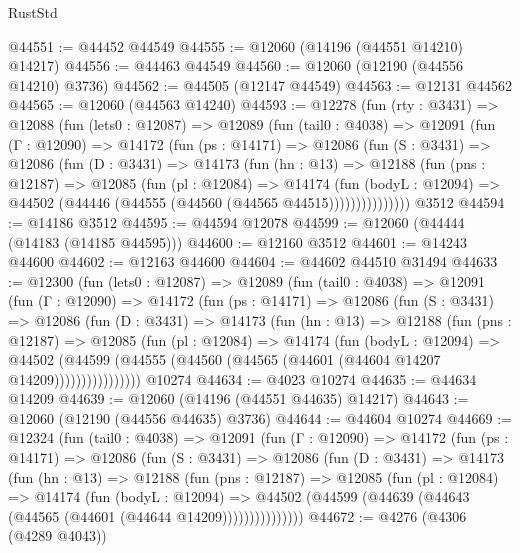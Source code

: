 \begin{lexlean}{RustStd}
\begin{coremodule}
@44551 := @44452 @44549
@44555 := @12060 (@14196 (@44551 @14210) @14217)
@44556 := @44463 @44549
@44560 := @12060 (@12190 (@44556 @14210) @3736)
@44562 := @44505 (@12147 @44549)
@44563 := @12131 @44562
@44565 := @12060 (@44563 @14240)
@44593 := @12278
    (fun (rty : @3431) =>
    @12088
      (fun (lets0 : @12087) =>
      @12089
        (fun (tail0 : @4038) =>
        @12091
          (fun (Γ : @12090) =>
          @14172
            (fun (ps : @14171) =>
            @12086
              (fun (S : @3431) =>
              @12086
                (fun (D : @3431) =>
                @14173
                  (fun (hn : @13) =>
                  @12188
                    (fun (pns : @12187) =>
                    @12085
                      (fun (pl : @12084) =>
                      @14174
                        (fun (bodyL : @12094) =>
                        @44502 (@44446 (@44555 (@44560 (@44565 @44515)))))))))))))))
    @3512
@44594 := @14186 @3512
@44595 := @44594 @12078
@44599 := @12060 (@44444 (@14183 (@14185 @44595)))
@44600 := @12160 @3512
@44601 := @14243 @44600
@44602 := @12163 @44600
@44604 := @44602 @44510 @31494
@44633 := @12300
    (fun (lets0 : @12087) =>
    @12089
      (fun (tail0 : @4038) =>
      @12091
        (fun (Γ : @12090) =>
        @14172
          (fun (ps : @14171) =>
          @12086
            (fun (S : @3431) =>
            @12086
              (fun (D : @3431) =>
              @14173
                (fun (hn : @13) =>
                @12188
                  (fun (pns : @12187) =>
                  @12085
                    (fun (pl : @12084) =>
                    @14174
                      (fun (bodyL : @12094) =>
                      @44502
                        (@44599
                          (@44555 (@44560 (@44565 (@44601 (@44604 @14207 @14209))))))))))))))))
    @10274
@44634 := @4023 @10274
@44635 := @44634 @14209
@44639 := @12060 (@14196 (@44551 @44635) @14217)
@44643 := @12060 (@12190 (@44556 @44635) @3736)
@44644 := @44604 @10274
@44669 := @12324
    (fun (tail0 : @4038) =>
    @12091
      (fun (Γ : @12090) =>
      @14172
        (fun (ps : @14171) =>
        @12086
          (fun (S : @3431) =>
          @12086
            (fun (D : @3431) =>
            @14173
              (fun (hn : @13) =>
              @12188
                (fun (pns : @12187) =>
                @12085
                  (fun (pl : @12084) =>
                  @14174
                    (fun (bodyL : @12094) =>
                    @44502 (@44599 (@44639 (@44643 (@44565 (@44601 (@44644 @14209)))))))))))))))
@44672 := @4276 (@4306 (@4289 @4043))

\end{coremodule}
\end{lexlean}
